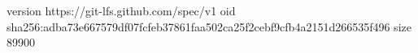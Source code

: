 version https://git-lfs.github.com/spec/v1
oid sha256:adba73e667579df07fcfeb37861faa502ca25f2cebf9cfb4a2151d266535f496
size 89900
